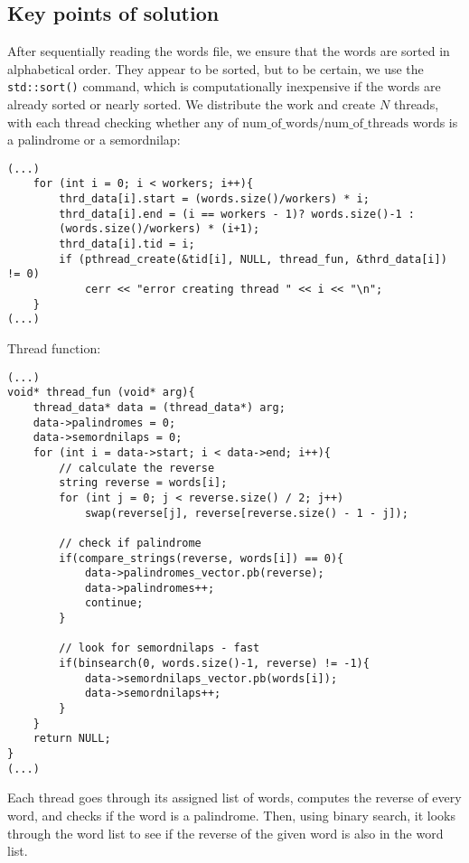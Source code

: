 \documentclass[a4paper,11pt]{article}
\begin{document}
\subsection*{Key points of solution}
After sequentially reading the words file, we ensure that the words are sorted in alphabetical order. They appear to be sorted, but to be certain, we use the \texttt{std::sort()} command, which is computationally inexpensive if the words are already sorted or nearly sorted. We distribute the work and create $N$ threads, with each thread checking whether any of $\text{num\_of\_words} / \text{num\_of\_threads}$ words is a palindrome or a semordnilap:

\begin{verbatim}
(...)
    for (int i = 0; i < workers; i++){
        thrd_data[i].start = (words.size()/workers) * i;
        thrd_data[i].end = (i == workers - 1)? words.size()-1 :
        (words.size()/workers) * (i+1);
        thrd_data[i].tid = i;
        if (pthread_create(&tid[i], NULL, thread_fun, &thrd_data[i]) != 0) 
            cerr << "error creating thread " << i << "\n";
    }
(...)
\end{verbatim}

Thread function:

\begin{verbatim}
(...)
void* thread_fun (void* arg){
    thread_data* data = (thread_data*) arg;
    data->palindromes = 0;
    data->semordnilaps = 0;
    for (int i = data->start; i < data->end; i++){
        // calculate the reverse
        string reverse = words[i];
        for (int j = 0; j < reverse.size() / 2; j++) 
            swap(reverse[j], reverse[reverse.size() - 1 - j]); 

        // check if palindrome
        if(compare_strings(reverse, words[i]) == 0){
            data->palindromes_vector.pb(reverse);
            data->palindromes++;
            continue;
        }

        // look for semordnilaps - fast
        if(binsearch(0, words.size()-1, reverse) != -1){
            data->semordnilaps_vector.pb(words[i]);
            data->semordnilaps++;
        } 
    }
    return NULL;
}
(...)
\end{verbatim}

Each thread goes through its assigned list of words, computes the reverse of every word, and checks if the word is a palindrome. Then, using binary search, it looks through the word list to see if the reverse of the given word is also in the word list.
\end{document}
